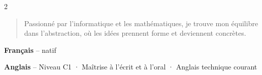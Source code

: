\documentclass[10pt,a4paper,ragged2e,withhyper]{altacv}
\begin{document}
\begin{paracol}{2}



\makecvheaderright

\vspace{-1em}
\begin{quote}
    \begin{justify}
        Passionné par l'informatique et les mathématiques, je trouve mon équilibre dans l'abstraction, où les idées prennent forme et deviennent concrètes.
    \end{justify}
\end{quote}







 \hfill{}


\hfill
{}\hfill
{}\hfill
{}\hfill
{}

\vspace{1em}

 \hfill
{}




\textbf{Français} -- natif

\vspace{1em}

\textbf{Anglais} -- Niveau C1 · Maîtrise à l’écrit et à l’oral · Anglais technique courant






 \hfill
{}\\
 \hfill
{}

\vspace{1em}

 \hfill
{}\\
 \hfill
{}
\medskip


\end{paracol}
\end{document}
